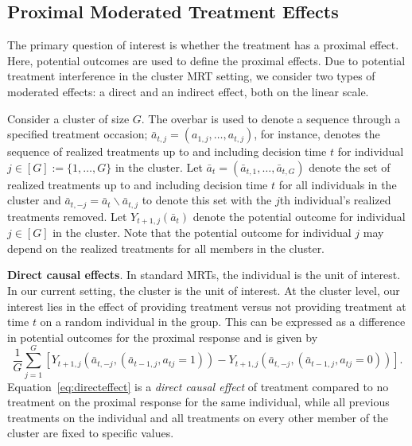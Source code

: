 \documentclass[12pt]{article}
\newcommand{\zw}[1]{\textcolor{blue}{[\textit{ZW: #1}]}}
\begin{document}
\subsection{Proximal Moderated Treatment Effects}
\label{section:prox_effects_pot_outcome}

The primary question of interest is whether the treatment has a proximal effect. Here, potential outcomes are used to define the proximal effects. Due to potential treatment interference in the cluster MRT setting, we consider two types of moderated effects: a direct and an indirect effect, both on the linear scale.

Consider a cluster of size $G$.  The overbar is used to denote a sequence through a specified treatment occasion; $\bar a_{t,j} = (a_{1,j},\ldots, a_{t,j})$, for instance, denotes the sequence of realized treatments up to and including decision time $t$ for individual $j \in [G]:=\{1,\ldots, G\}$ in the cluster.   Let $\bar a_{t} = (\bar a_{t,1}, \ldots, \bar a_{t,G})$ denote the set of realized treatments up to and including decision time $t$ for all individuals in the cluster and $\bar a_{t,-j} = \bar a_t \backslash \bar a_{t,j}$ to denote this set with the $j$th individual's realized treatments removed. Let $Y_{t+1,j} (\bar a_{t})$ denote the potential outcome for individual $j \in [G]$ in the cluster.  Note that the potential outcome for individual $j$ may depend on the realized treatments for all members in the cluster.

\noindent \textbf{Direct causal effects}.
In standard MRTs, the individual is the unit of interest.  In our current setting, the cluster is the unit of interest.  At the cluster level, our interest lies in the effect of providing treatment versus not providing treatment at time $t$ on a random individual in the group.  This can be expressed as a difference in potential outcomes for the proximal response and is given by
\begin{equation}
\label{eq:directeffect}
\frac{1}{G} \sum_{j=1}^G \left[ Y_{t+1,j} (\bar a_{t,-j}, (\bar a_{t-1,j}, a_{tj}=1)) - Y_{t+1,j} (\bar a_{t,-j}, (\bar a_{t-1,j}, a_{tj}=0)) \right].
\end{equation}
Equation~\eqref{eq:directeffect} is a \emph{direct causal effect} of treatment compared to no treatment on the proximal response for the same individual, while all previous treatments on the individual and all treatments on every other member of the cluster are fixed to specific values.
\end{document}
